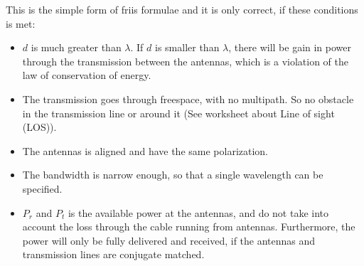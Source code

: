 This is the simple form of friis formulae and it is only correct, if these conditions is met:
\begin{itemize}
\item $d$ is much greater than $\lambda$. If $d$ is smaller than $\lambda$, there will be gain in power through the transmission between the antennas, which is a violation of the law of conservation of energy.
\item The transmission goes through freespace, with no multipath. So no obstacle in the transmission line or around it (See worksheet about Line of sight (LOS)).
\item The antennas is aligned and have the same polarization.
\item The bandwidth is narrow enough, so that a single wavelength can be specified.
\item $P_r$ and $P_t$ is the available power at the antennas, and do not take into account the loss through the cable running from antennas. Furthermore, the power will only be fully delivered and received, if the antennas and transmission lines are conjugate matched.
\end{itemize}

